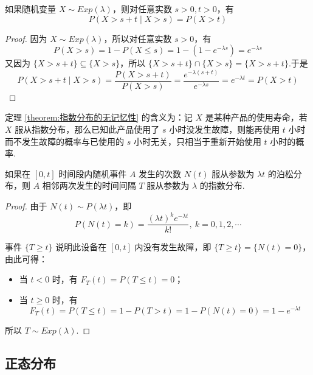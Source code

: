 \begin{theorem}
    \indent 如果随机变量 $X \sim Exp(\lambda)$，则对任意实数 $s>0, t>0$，有
    \begin{equation}
        P(X > s+t \mid X>s) = P(X>t)
    \end{equation}
\end{theorem}

\begin{proof}
    因为 $X \sim Exp(\lambda)$，所以对任意实数 $s>0$，有
    $$
    P(X>s) = 1 - P(X \leqslant s) = 1 - (1 - e^{-\lambda s}) = e^{-\lambda s}
    $$
    又因为 $\{ X > s+t \} \subseteq \{ X>s \}$，所以 $\{ X > s+t \} \cap \{ X>s \} = \{ X > s+t \}$.于是
    $$
    P(X > s+t \mid X>s) = \dfrac{P(X > s+t)}{P(X>s)} = \dfrac{e^{-\lambda (s+t)}}{e^{-\lambda s}} = e^{-\lambda t} = P(X > t)
    $$

    \vspace{-2em}
\end{proof}

定理 \ref{theorem:指数分布的无记忆性} 的含义为：记 $X$ 是某种产品的使用寿命，若 $X$ 服从指数分布，那么已知此产品使用了 $s$ 小时没发生故障，则能再使用 $t$ 小时而不发生故障的概率与已使用的 $s$ 小时无关，只相当于重新开始使用 $t$ 小时的概率.

\begin{conclusion}[][泊松分布与指数分布的关系]
    \indent 如果在 $[0,t]$ 时间段内随机事件 $A$ 发生的次数 $N(t)$ 服从参数为 $\lambda t$ 的泊松分布，则 $A$ 相邻两次发生的时间间隔 $T$ 服从参数为 $\lambda$ 的指数分布.
\end{conclusion}

\begin{proof}
    由于 $N(t) \sim P(\lambda t)$，即
    $$
    P(N(t) = k) = \dfrac{(\lambda t)^k e^{- \lambda t}}{k!},\ k=0,1,2,\cdots
    $$

    事件 $\{ T \geqslant t \}$ 说明此设备在 $[0,t]$ 内没有发生故障，即 $\{ T \geqslant t \} = \{ N(t) = 0 \}$，由此可得：
    \begin{itemize}
        \item 当 $t<0$ 时，有 $F_T(t) = P(T \leqslant t) = 0$；
        \item 当 $t \geqslant 0$ 时，有
        $$
        F_T(t) = P(T \leqslant t) = 1 - P(T>t) = 1 - P(N(t) = 0) = 1 - e^{-\lambda t}
        $$
    \end{itemize}
    所以 $T \sim Exp(\lambda)$.
\end{proof}

\subsection{正态分布}

